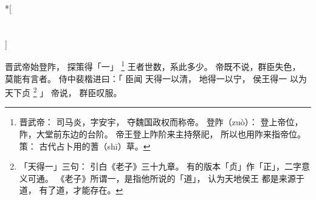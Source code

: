 
\switchcolumn[0]*[\section{}]

晋武帝始登阼，
探策得「一」%
\footnote{%
    晋武帝：
        司马炎，字安宇，
        夺魏国政权而称帝。
    登阼（zuò）：
        登上帝位，
        阼，大堂前东边的台阶。
        帝王登上阼阶来主持祭祀，
        所以也用阼来指帝位。
    策：
        古代占卜用的蓍（shī）草。
}%
王者世数，系此多少。
帝既不说，群臣失色，
莫能有言者。
侍中裴楷进曰：「
    臣闻
    天得一以清，
    地得一以宁，
    侯王得一
    以为天下贞%
    \footnote{%
        「天得一」三句：
            引白《老子》三十九章。
            有的版本「贞」作「正」，二字意义可通。
            《老子》所谓一，是指他所说的「道」，
            认为天地侯王
            都是来源于道，
            有了道，才能存在。
    }%
」
帝说，
群臣叹服。

\switchcolumn



